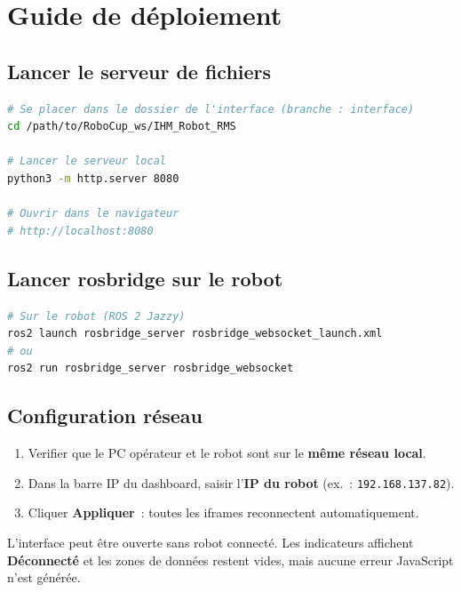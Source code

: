 \documentclass[12pt,a4paper]{report}
\begin{document}
\chapter{Guide de déploiement}

\section{Lancer le serveur de fichiers}

\begin{lstlisting}[language=bash, caption={Démarrage du serveur HTTP pour l'IHM}]
# Se placer dans le dossier de l'interface (branche : interface)
cd /path/to/RoboCup_ws/IHM_Robot_RMS

# Lancer le serveur local
python3 -m http.server 8080

# Ouvrir dans le navigateur
# http://localhost:8080
\end{lstlisting}

\section{Lancer rosbridge sur le robot}

\begin{lstlisting}[language=bash, caption={Démarrage de rosbridge\_server}]
# Sur le robot (ROS 2 Jazzy)
ros2 launch rosbridge_server rosbridge_websocket_launch.xml
# ou
ros2 run rosbridge_server rosbridge_websocket
\end{lstlisting}

\section{Configuration réseau}

\begin{enumerate}
  \item Verifier que le PC opérateur et le robot sont sur le \textbf{même réseau local}.
  \item Dans la barre IP du dashboard, saisir l'\textbf{IP du robot} (ex.~: \texttt{192.168.137.82}).
  \item Cliquer \textbf{Appliquer}~: toutes les iframes reconnectent automatiquement.
\end{enumerate}

\begin{infobox}
L'interface peut être ouverte sans robot connecté. Les indicateurs affichent \textcolor{codered}{\textbf{🔴 Déconnecté}} et les zones de données restent vides, mais aucune erreur JavaScript n'est générée.
\end{infobox}
\end{document}
